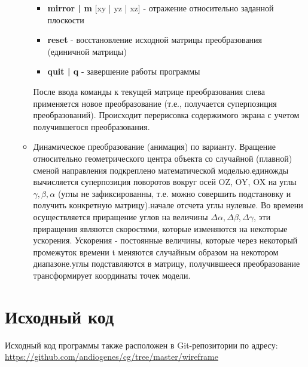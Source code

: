 \documentclass[a4paper,12pt]{article}
\begin{document}
\begin{flushleft}
\begin{enumerate}
\begin{itemize}
\begin{itemize}
            \item \textbf{mirror | m} [xy | yz | xz] - отражение относительно заданной плоскости
            \item \textbf{reset} - восстановление исходной матрицы преобразования (единичной матрицы)
            \item \textbf{quit | q} - завершение работы программы
          \end{itemize}
          После ввода команды к текущей матрице преобразования слева применяется новое преобразование (т.е., получается суперпозиция преобразований). Происходит перерисовка содержимого экрана с учетом получившегося преобразования.
        \item Динамическое преобразование (анимация) по варианту. Вращение относительно геометрического центра объекта со случайной (плавной) сменой направления подкреплено математической моделью.\linebreak{} единожды вычисляется суперпозиция поворотов вокруг осей OZ, OY, OX на углы \(\gamma, \beta, \alpha\) (углы не зафиксированны, т.е. можно совершить подстановку и получить конкретную матрицу).\linebreak{} начале отсчета углы нулевые. Во времени осуществляется приращение углов на величины \(\Delta\alpha, \Delta\beta, \Delta\gamma\), эти приращения являются скоростями, которые изменяются на некоторые ускорения. Ускорения - постоянные величины, которые через некоторый промежуток времени t меняются случайным образом на некотором диапазоне.\linebreak{} углы подставляются в матрицу, получившееся преобразование трансформирует координаты точек модели.
      \end{itemize}
  \end{enumerate}
\end{flushleft}

\section{\normalsize{Исходный код}}
Исходный код программы также расположен в Git-репозитории по адресу: \url{https://github.com/andiogenes/cg/tree/master/wireframe}
\inputminted[breaklines]{python}{../wireframe.py}
\end{document}
